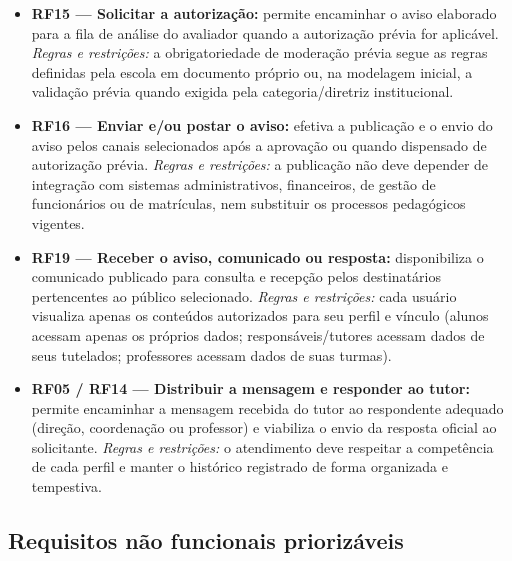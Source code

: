 \documentclass[a4paper,12pt]{report}
\begin{document}
\begin{itemize}
    \item \textbf{RF15 — Solicitar a autorização:} permite encaminhar o aviso elaborado para a fila de análise do avaliador quando a autorização prévia for aplicável. \textit{Regras e restrições:} a obrigatoriedade de moderação prévia segue as regras definidas pela escola em documento próprio ou, na modelagem inicial, a validação prévia quando exigida pela categoria/diretriz institucional.
    
    \item \textbf{RF16 — Enviar e/ou postar o aviso:} efetiva a publicação e o envio do aviso pelos canais selecionados após a aprovação ou quando dispensado de autorização prévia. \textit{Regras e restrições:} a publicação não deve depender de integração com sistemas administrativos, financeiros, de gestão de funcionários ou de matrículas, nem substituir os processos pedagógicos vigentes.
    
    \item \textbf{RF19 — Receber o aviso, comunicado ou resposta:} disponibiliza o comunicado publicado para consulta e recepção pelos destinatários pertencentes ao público selecionado. \textit{Regras e restrições:} cada usuário visualiza apenas os conteúdos autorizados para seu perfil e vínculo (alunos acessam apenas os próprios dados; responsáveis/tutores acessam dados de seus tutelados; professores acessam dados de suas turmas).
    
    \item \textbf{RF05 / RF14 — Distribuir a mensagem e responder ao tutor:} permite encaminhar a mensagem recebida do tutor ao respondente adequado (direção, coordenação ou professor) e viabiliza o envio da resposta oficial ao solicitante. \textit{Regras e restrições:} o atendimento deve respeitar a competência de cada perfil e manter o histórico registrado de forma organizada e tempestiva.
\end{itemize}

\subsection{Requisitos não funcionais priorizáveis}
\end{document}
